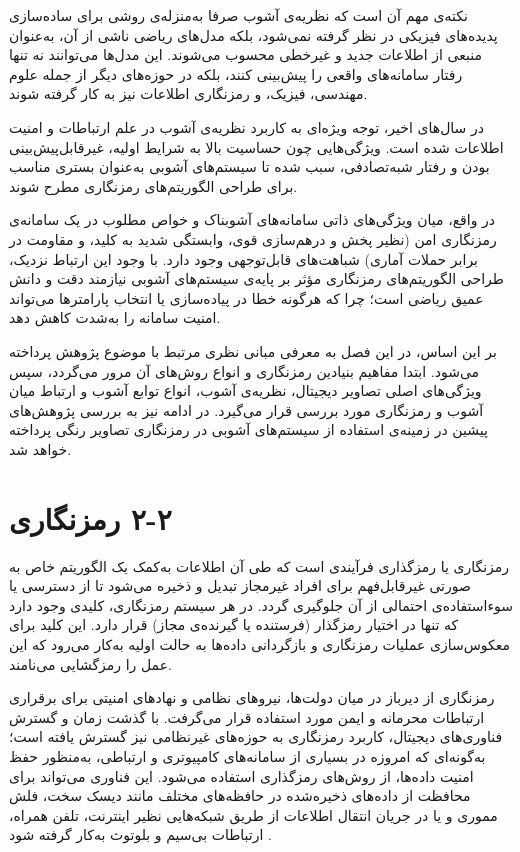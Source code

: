 نکته‌ی مهم آن است که نظریه‌ی آشوب صرفا به‌منزله‌ی روشی برای ساده‌سازی پدیده‌های فیزیکی در نظر گرفته نمی‌شود، بلکه مدل‌های ریاضی ناشی از آن، به‌عنوان منبعی از اطلاعات جدید و غیرخطی محسوب می‌شوند. این مدل‌ها می‌توانند نه تنها رفتار سامانه‌های واقعی را پیش‌بینی کنند، بلکه در حوزه‌های دیگر از جمله علوم مهندسی، فیزیک، و رمزنگاری اطلاعات نیز به کار گرفته شوند.

در سال‌های اخیر، توجه ویژه‌ای به کاربرد نظریه‌ی آشوب در علم ارتباطات و امنیت اطلاعات شده است. ویژگی‌هایی چون حساسیت بالا به شرایط اولیه، غیرقابل‌پیش‌بینی بودن و رفتار شبه‌تصادفی، سبب شده تا سیستم‌های آشوبی به‌عنوان بستری مناسب برای طراحی الگوریتم‌های رمزنگاری مطرح شوند.

در واقع، میان ویژگی‌های ذاتی سامانه‌های آشوبناک و خواص مطلوب در یک سامانه‌ی رمزنگاری امن (نظیر پخش و درهم‌سازی قوی، وابستگی شدید به کلید، و مقاومت در برابر حملات آماری) شباهت‌های قابل‌توجهی وجود دارد. با وجود این ارتباط نزدیک، طراحی الگوریتم‌های رمزنگاری مؤثر بر پایه‌ی سیستم‌های آشوبی نیازمند دقت و دانش عمیق ریاضی است؛ چرا که هرگونه خطا در پیاده‌سازی یا انتخاب پارامترها می‌تواند امنیت سامانه را به‌شدت کاهش دهد.

بر این اساس، در این فصل به معرفی مبانی نظری مرتبط با موضوع پژوهش پرداخته می‌شود. ابتدا مفاهیم بنیادین رمزنگاری و انواع روش‌های آن مرور می‌گردد، سپس ویژگی‌های اصلی تصاویر دیجیتال، نظریه‌ی آشوب، انواع توابع آشوب و ارتباط میان آشوب و رمزنگاری مورد بررسی قرار می‌گیرد. در ادامه نیز به بررسی پژوهش‌های پیشین در زمینه‌ی استفاده از سیستم‌های آشوبی در رمزنگاری تصاویر رنگی پرداخته خواهد شد.

\section{‏۲‏-‏۲‏ رمزنگاری}

رمزنگاری یا رمزگذاری فرآیندی است که طی آن اطلاعات به‌کمک یک الگوریتم خاص به صورتی غیرقابل‌فهم برای افراد غیرمجاز تبدیل و ذخیره می‌شود تا از دسترسی یا سوء‌استفاده‌ی احتمالی از آن جلوگیری گردد. در هر سیستم رمزنگاری، کلیدی وجود دارد که تنها در اختیار رمزگذار (فرستنده یا گیرنده‌ی مجاز) قرار دارد. این کلید برای معکوس‌سازی عملیات رمزنگاری و بازگردانی داده‌ها به حالت اولیه به‌کار می‌رود که این عمل را رمزگشایی می‌نامند.

رمزنگاری از دیرباز در میان دولت‌ها، نیروهای نظامی و نهادهای امنیتی برای برقراری ارتباطات محرمانه و ایمن مورد استفاده قرار می‌گرفت. با گذشت زمان و گسترش فناوری‌های دیجیتال، کاربرد رمزنگاری به حوزه‌های غیرنظامی نیز گسترش یافته است؛ به‌گونه‌ای که امروزه در بسیاری از سامانه‌های کامپیوتری و ارتباطی، به‌منظور حفظ امنیت داده‌ها، از روش‌های رمزگذاری استفاده می‌شود. این فناوری می‌تواند برای محافظت از داده‌های ذخیره‌شده در حافظه‌های مختلف مانند دیسک سخت، فلش مموری و یا در جریان انتقال اطلاعات از طریق شبکه‌هایی نظیر اینترنت، تلفن همراه، ارتباطات بی‌سیم و بلوتوث به‌کار گرفته شود \cite{ref14}.

